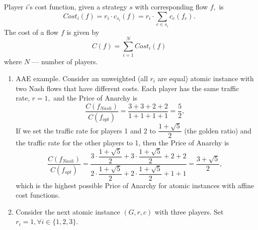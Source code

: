 \documentclass[a4paper, 12pt]{article}
\begin{document}
Player $i$’s cost function, given a strategy $s$ with corresponding flow $f,$ is
$$
	Cost_i(f) = r_i \cdot c_{s_i}(f) = r_i \cdot \sum \limits_{e \in s_i} c_e(f_e).
$$
The cost of a flow $f$ is given by
$$
C(f) = \sum \limits_{i=1}^N Cost_i(f)
$$
where $N$ --- number of players.
\begin{enumerate}
	\item AAE example. Consider an unweighted (all $r_i$ are equal) atomic instance with two Nash flows that have different costs. Each player
has the same traffic rate, $r = 1,$ and the Price of Anarchy is 
$$
\dfrac{C(f_{Nash})}{C(f_{opt})} = \dfrac{3 + 3 + 2 + 2}{1 + 1 + 1 + 1} = \dfrac{5}{2},
$$
 If we set the
traffic rate for players 1 and 2 to $\dfrac{1 + \sqrt{5}}{2}$ (the golden ratio) and the traffic
rate for the other players to 1, then the Price of Anarchy is 
$$
\dfrac{C(f_{Nash})}{C(f_{opt})} = \dfrac{3 \cdot \dfrac{1 + \sqrt{5}}{2} + 3 \cdot \dfrac{1 + \sqrt{5}}{2} + 2 + 2}{2 \cdot \dfrac{1 + \sqrt{5}}{2} + 2 \cdot \dfrac{1 + \sqrt{5}}{2} + 1 + 1} = \dfrac{3 + \sqrt{5}}{2},
$$ which
is the highest possible Price of Anarchy for atomic instances with affine cost functions. 
	\item Consider the next atomic instance $(G, r, c)$ with three players. Set $r_i = 1, \forall i \in \{1, 2, 3\}.$ 
	

\end{enumerate}
\end{document}
